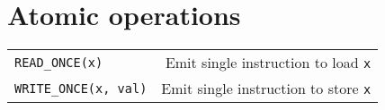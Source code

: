 %


\section{Atomic operations}

\begin{header}
\begin{tabularx}{\linewidth}{@{}lR@{}}
\texttt{READ\_ONCE(x)} & Emit single instruction to load \texttt{x} \\
\texttt{WRITE\_ONCE(x, val)} & Emit single instruction to store \texttt{x} \\
\end{tabularx}
\end{header}

